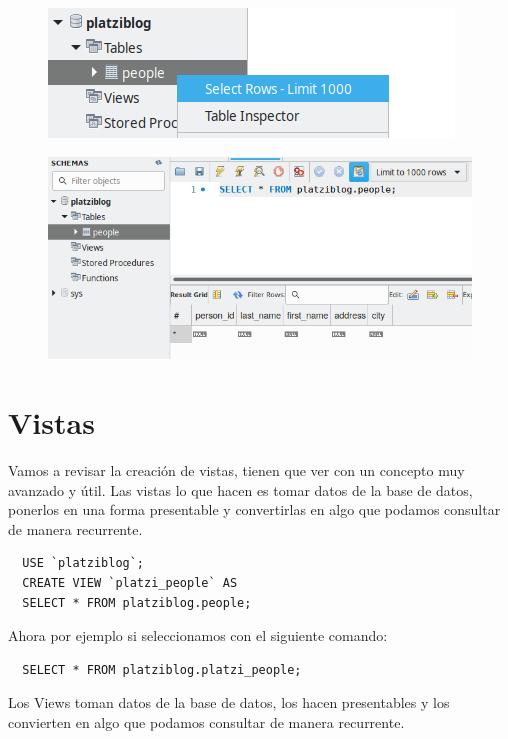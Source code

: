 \documentclass{article}
\begin{document}
\begin{figure}[h!]
  \centering
  \includegraphics[scale=0.75]{./Pictures/048_selec.png}
\end{figure}

\begin{figure}[h!]
  \centering
  \includegraphics[scale=0.75]{./Pictures/049_select.png}
\end{figure}

\newpage

\section{Vistas}%
Vamos a revisar la creación de vistas, tienen que ver con un concepto muy
avanzado y útil. Las vistas lo que hacen es tomar datos de la base de datos,
ponerlos en una forma presentable y convertirlas en algo que podamos consultar
de manera recurrente.\\

\begin{verbatim}
  USE `platziblog`;
  CREATE VIEW `platzi_people` AS
  SELECT * FROM platziblog.people;
\end{verbatim}

Ahora por ejemplo si seleccionamos con el siguiente comando:

\begin{verbatim}
  SELECT * FROM platziblog.platzi_people;
\end{verbatim}

Los Views toman datos de la base de datos, los hacen presentables y los
convierten en algo que podamos consultar de manera recurrente.
\end{document}
